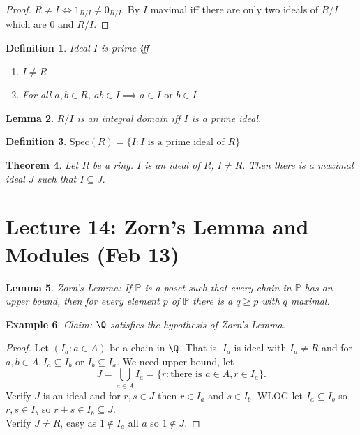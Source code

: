\documentclass[a4paper,12pt]{article}
\newtheorem{thm}{Theorem}[section]
\newtheorem{lem}[thm]{Lemma}
\newtheorem{defn}[thm]{Definition}
\newtheorem{eg}[thm]{Example}
\begin{document}
\begin{proof}
    $R\neq I \iff 1_{R/I}\neq 0_{R/I}$. By $I$ maximal iff there are only two ideals of $R/I$ which are $0$ and $R/I$. 
\end{proof}
\begin{defn}
    Ideal $I$ is prime iff 
    \begin{enumerate}
        \item $I \neq R$
        \item For all $a,b\in R$, $ab\in I \implies a\in I \text{ or } b\in I$
    \end{enumerate}
\end{defn}
\begin{lem}
    $R/I$ is an integral domain iff $I$ is a prime ideal.
\end{lem}
\begin{defn}
    $ \text{Spec}(R)=\{I: I \text{ is a prime ideal of } R\}$
\end{defn}
\begin{thm}
    Let $R$ be a ring. $I$ is an ideal of $R$, $I\neq R$. Then there is a maximal ideal $J$ such that $I\subseteq J.$ 
\end{thm}
\newpage
\section{Lecture 14: Zorn's Lemma and Modules (Feb 13)}
\begin{lem}
    Zorn's Lemma: If $\mathbb{P}$ is a poset such that every chain in $\mathbb{P}$ has an upper bound, then for every element $p$ of $\mathbb{P}$ there is a $q\geq p$ with $q$ maximal. 
\end{lem}
\begin{eg}
    Claim: $\Q$ satisfies the hypothesis of Zorn's Lemma.
\end{eg}
\begin{proof}
    Let $(I_a:a\in A)$ be a chain in $\Q$. That is, $I_a$ is ideal with $I_a\neq R$ and for $a,b\in A, I_a\subseteq I_b$ or $I_b \subseteq I_a$. We need upper bound, let \[
    J=\bigcup_{a\in A}I_a= \{r: \text{there is }a\in A, r\in I_a\}
    .\] 
    Verify $J$ is an ideal and for $r,s\in J$ then $r\in I_a$ and $s\in I_b$. WLOG let $I_a \subseteq I_b$ so $r,s\in I_b$ so $r+s\in I_b\subseteq J$. \\
    Verify $J\neq R$, easy as $1\notin I_a$ all $a$ so $1 \notin J$. 
\end{proof}
\end{document}
